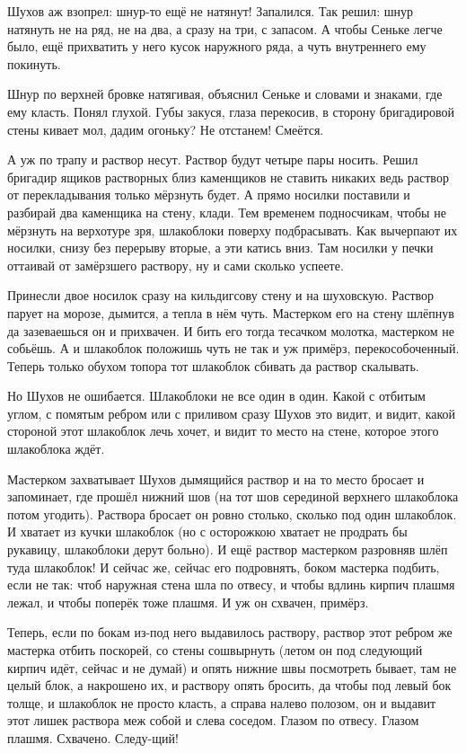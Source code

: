 Шухов аж взопрел: шнур-то ещё не натянут! Запалился. Так решил: шнур натянуть не на ряд, не на
два, а сразу на три, с запасом. А чтобы Сеньке легче было, ещё прихватить у него кусок
наружного ряда, а чуть внутреннего ему покинуть.

Шнур по верхней бровке натягивая, объяснил Сеньке и словами и знаками, где ему класть. Понял
глухой. Губы закуся, глаза перекосив, в сторону бригадировой стены кивает \dash мол, дадим
огоньку? Не отстанем! Смеётся.

А уж по трапу и раствор несут. Раствор будут четыре пары носить. Решил бригадир ящиков
растворных близ каменщиков не ставить никаких \dash ведь раствор от перекладывания только
мёрзнуть будет. А прямо носилки поставили \dash и разбирай два каменщика на стену, клади. Тем
временем подносчикам, чтобы не мёрзнуть на верхотуре зря, шлакоблоки поверху подбрасывать.
Как вычерпают их носилки, снизу без перерыву \dash вторые, а эти катись вниз. Там носилки у печки
оттаивай от замёрзшего раствору, ну и сами сколько успеете.

Принесли двое носилок сразу \dash на кильдигсову стену и на шуховскую. Раствор парует на морозе,
дымится, а тепла в нём чуть. Мастерком его на стену шлёпнув да зазеваешься \dash он и прихвачен. И
бить его тогда тесачком молотка, мастерком не собьёшь. А и шлакоблок положишь чуть не так \dash и
уж примёрз, перекособоченный. Теперь только обухом топора тот шлакоблок сбивать да раствор
скалывать.

Но Шухов не ошибается. Шлакоблоки не все один в один. Какой с отбитым углом, с помятым ребром
или с приливом \dash сразу Шухов это видит, и видит, какой стороной этот шлакоблок лечь хочет, и
видит то место на стене, которое этого шлакоблока ждёт.

Мастерком захватывает Шухов дымящийся раствор \dash и на то место бросает и запоминает, где
прошёл нижний шов (на тот шов серединой верхнего шлакоблока потом угодить). Раствора бросает
он ровно столько, сколько под один шлакоблок. И хватает из кучки шлакоблок (но с осторожкою
хватает \dash не продрать бы рукавицу, шлакоблоки дерут больно). И ещё раствор мастерком
разровняв \dash шлёп туда шлакоблок! И сейчас же, сейчас его подровнять, боком мастерка подбить,
если не так: чтоб наружная стена шла по отвесу, и чтобы вдлинь кирпич плашмя лежал, и чтобы
поперёк тоже плашмя. И уж он схвачен, примёрз.

Теперь, если по бокам из-под него выдавилось раствору, раствор этот ребром же мастерка
отбить поскорей, со стены сошвырнуть (летом он под следующий кирпич идёт, сейчас и не думай) и
опять нижние швы посмотреть \dash бывает, там не целый блок, а накрошено их, \dash и раствору опять
бросить, да чтобы под левый бок толще, и шлакоблок не просто класть, а справа налево полозом,
он и выдавит этот лишек раствора меж собой и слева соседом. Глазом по отвесу. Глазом плашмя.
Схвачено. Следу-щий!

